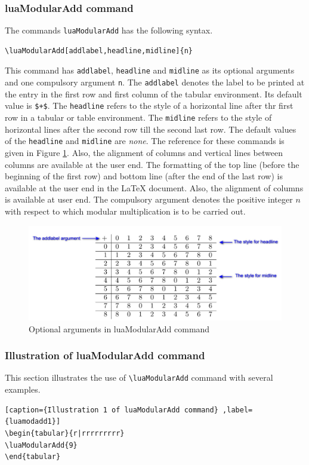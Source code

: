 ﻿\documentclass{article}
\begin{document}
\subsubsection{luaModularAdd command}
The commands \verb|luaModularAdd| has the following syntax.
\begin{verbatim}
\luaModularAdd[addlabel,headline,midline]{n}
\end{verbatim}
This command has  \verb|addlabel|, \verb|headline| and \verb|midline| as its optional arguments and one compulsory argument \verb|n|. The \verb|addlabel| denotes the label to be printed at the entry in the first row and first column of the tabular environment. Its default value is \verb|$+$|. The \verb|headline| refers to the style of a horizontal line after thr first row in a tabular or table environment. The \verb|midline| refers to the style of horizontal lines after the second row till the second last row.  The default values of the \verb|headline| and \verb|midline| are \emph{none}.  The reference for these commands is given in Figure \ref{fig:luamodularadd}. Also, the alignment of columns and vertical lines between columns are available at the user end. The formatting of the top line (before the beginning of the first row) and bottom line (after the end of the last row) is available at the user end in the LaTeX document. Also, the alignment of columns is available at user end. The compulsory argument denotes the positive integer \(n\) with respect to which modular multiplication is to be carried out.

\begin{figure}[!ht] %
  \centering
  \includegraphics[scale=0.27]{luamodularadd.jpg}
  \caption{Optional arguments in luaModularAdd command}
  \label{fig:luamodularadd}
\end{figure}
\subsubsection{Illustration of luaModularAdd command }
This section illustrates the use of \verb|\luaModularAdd| command with several examples.
\begin{lstlisting}[caption={Illustration 1 of luaModularAdd command} ,label={luamodadd1}]
\begin{tabular}{r|rrrrrrrrr}
\luaModularAdd{9}
\end{tabular}
\end{lstlisting}
\end{document}
